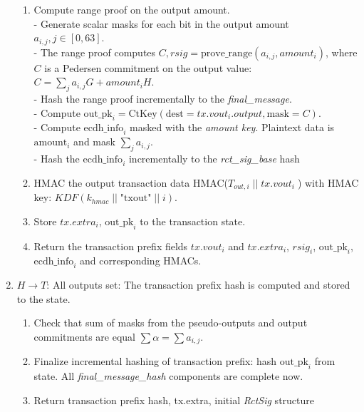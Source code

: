 \documentclass[]{article}
\begin{document}
\begin{enumerate}
\begin{enumerate}
        \item Compute range proof on the output amount. \\
        - Generate scalar masks for each bit in the output amount $a_{i, j}, j \in [0, 63]$. \\
        - The range proof computes $C, rsig = \text{prove\_range}(a_{i, j}, amount_i)$, where $C$ is a Pedersen commitment on the output value: $C = \sum_{j}a_{i, j} G + amount_i H$. \\
        - Hash the range proof incrementally to the \emph{final\_message}.\\
        - Compute $\text{out\_pk}_i = \text{CtKey}(\text{dest}=tx.vout_i.output,\text{mask}=C)$.\\  
        - Compute $\text{ecdh\_info}_i$ masked with the \emph{amount key}. Plaintext data is $\text{amount}_i$ and mask $\sum_{j}a_{i, j}$. \\ \medskip
        - Hash the $\text{ecdh\_info}_i$ incrementally to the \emph{rct\_sig\_base} hash

        \item HMAC the output transaction data HMAC($T_{out,i} \; || \; tx.vout_i \; $) with HMAC key: $\textit{KDF}(k_{hmac} \; || \; \text{"txout"} \; || \; i)$.
                
        \item Store $tx.extra_i$, $\text{out\_pk}_i$ to the transaction state.
        
		\item Return the transaction prefix fields $tx.vout_i$ and $tx.extra_i$, $rsig_i$, $\text{out\_pk}_i$, $\text{ecdh\_info}_i$ and corresponding HMACs.
		
	\end{enumerate}
	  
	\item $H \rightarrow T$: All outputs set: The transaction prefix hash is computed and stored to the state. 
	
	\begin{enumerate}
		\item Check that sum of masks from the pseudo-outputs and output commitments are equal $\sum \alpha = \sum a_{i,j}$.
		
		\item Finalize incremental hashing of transaction prefix: hash $\text{out\_pk}_i$ from state. All \emph{final\_message\_hash} components are complete now. 
		
		\item Return transaction prefix hash, tx.extra, initial \emph{RctSig} structure
	\end{enumerate} 


\end{enumerate}
\end{document}
